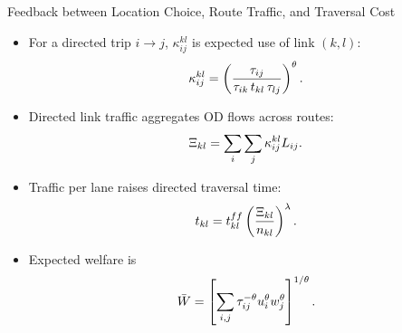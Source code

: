 \documentclass[11pt,aspectratio=169]{beamer}
\begin{document}
\begin{frame}{Feedback between Location Choice, Route Traffic, and Traversal Cost}
\begin{itemize}\footnotesize
  \item For a directed trip $i\to j$, $\kappa^{kl}_{ij}$ is expected use of link $(k,l)$:
  \vspace{-0.8em}\begin{equation}
    \kappa^{kl}_{ij}=\left(\frac{\tau_{ij}}{\tau_{ik}\,t_{kl}\,\tau_{lj}}\right)^\theta.
  \vspace{-0.6em}\end{equation}
  \item Directed link traffic aggregates OD flows across routes:
  \vspace{-0.5em}\begin{equation}\label{eq:Xi_c}
    \Xi_{kl}=\sum_i\sum_j\kappa^{kl}_{ij}L_{ij}.
  \vspace{-0.6em}\end{equation}
  \item Traffic per lane raises directed traversal time:
  \vspace{-0.5em}\begin{equation}\label{eq:c_Xi}
    t_{kl}=t_{kl}^{ff}\left(\frac{\Xi_{kl}}{n_{kl}}\right)^\lambda.
  \vspace{-0.6em}\end{equation}
  \item Expected welfare is
  \vspace{-0.5em}\begin{equation}
    \bar W=\left[\sum_{i,j}\tau_{ij}^{-\theta}u_i^\theta w_j^\theta\right]^{1/\theta}.
  \vspace{-0.8em}\end{equation}
\end{itemize}
\end{frame}
\end{document}

